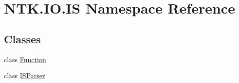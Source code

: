\hypertarget{namespace_n_t_k_1_1_i_o_1_1_i_s}{}\section{N\+T\+K.\+I\+O.\+IS Namespace Reference}
\label{namespace_n_t_k_1_1_i_o_1_1_i_s}
\subsection*{Classes}
\begin{DoxyCompactItemize}
\item 
class \mbox{\hyperlink{class_n_t_k_1_1_i_o_1_1_i_s_1_1_function}{Function}}
\item 
class \mbox{\hyperlink{class_n_t_k_1_1_i_o_1_1_i_s_1_1_i_s_parser}{I\+S\+Parser}}
\end{DoxyCompactItemize}
